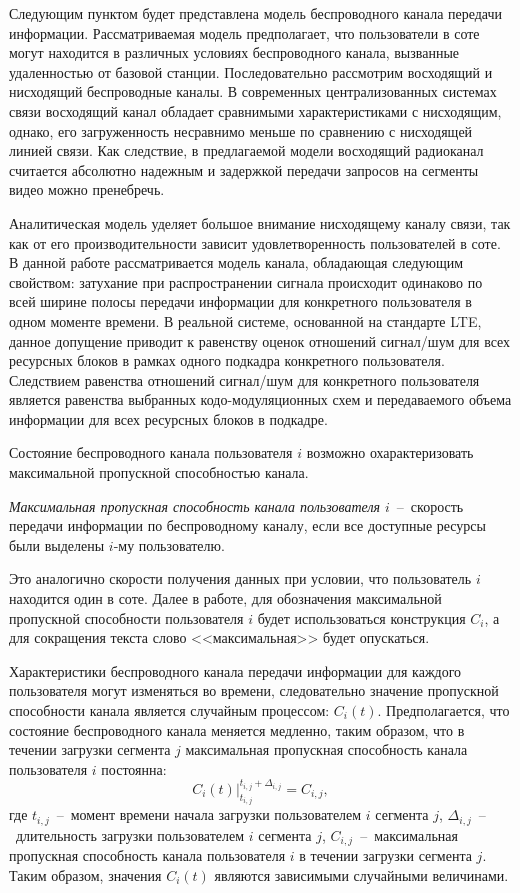 Следующим пунктом будет представлена модель беспроводного канала передачи информации. Рассматриваемая модель предполагает, что пользователи в соте могут находится в различных условиях беспроводного канала, вызванные удаленностью от базовой станции. Последовательно рассмотрим восходящий и нисходящий беспроводные каналы. В современных централизованных системах связи восходящий канал обладает сравнимыми характеристиками с нисходящим, однако, его загруженность несравнимо меньше по сравнению с нисходящей линией связи. Как следствие, в предлагаемой модели восходящий радиоканал считается абсолютно надежным и задержкой передачи запросов на сегменты видео можно пренебречь.

Аналитическая модель уделяет большое внимание нисходящему каналу связи, так как от его производительности зависит удовлетворенность пользователей в соте. В данной работе рассматривается модель канала, обладающая следующим свойством: затухание при распространении сигнала происходит одинаково по всей ширине полосы передачи информации для конкретного пользователя в одном моменте времени. В реальной системе, основанной на стандарте LTE, данное допущение приводит к равенству оценок отношений сигнал/шум для всех ресурсных блоков в рамках одного подкадра конкретного пользователя. Следствием равенства отношений сигнал/шум для конкретного пользователя является равенства выбранных кодо-модуляционных схем и передаваемого объема информации для всех ресурсных блоков в подкадре.

Состояние беспроводного канала пользователя $i$ возможно охарактеризовать максимальной пропускной способностью канала.
\begin{definition}
\label{def:MaxThroughput}
    \emph{Максимальная пропускная способность канала пользователя $i$}~--~скорость передачи информации по беспроводному каналу, если все доступные ресурсы были выделены $i$-му пользователю.
\end{definition}
Это аналогично скорости получения данных при условии, что пользователь $i$ находится один в соте. Далее в работе, для обозначения максимальной пропускной способности пользователя $i$ будет использоваться конструкция $C_i$, а для сокращения текста слово <<максимальная>> будет опускаться.

Характеристики беспроводного канала передачи информации для каждого пользователя могут изменяться во времени, следовательно значение пропускной способности канала является случайным процессом: $C_i(t)$. Предполагается, что состояние беспроводного канала меняется медленно, таким образом, что в течении загрузки сегмента $j$ максимальная пропускная способность канала пользователя $i$ постоянна:
\begin{equation}
\nonumber
\left.C_i(t)\right\vert^{t_{i,j}+\Delta_{i,j}}_{t_{i,j}}=C_{i,j},
\label{eq:ChannelConst}
\end{equation}
где $t_{i,j}$~--~момент времени начала загрузки пользователем $i$ сегмента $j$, $\Delta_{i,j}$~--~длительность загрузки пользователем $i$ сегмента $j$, $C_{i,j}$~--~максимальная пропускная способность канала пользователя $i$ в течении загрузки сегмента $j$. Таким образом, значения $C_i(t)$ являются зависимыми случайными величинами.

